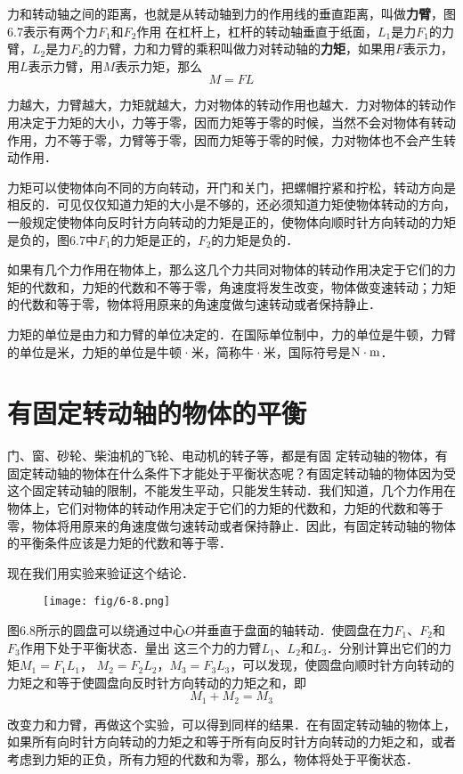 力和转动轴之间的距离，也就是从转动轴到力的作用线的垂直距离，叫做\textbf{力臂}，图6.7表示有两个力$F_1$和$F_2$作用
在杠杆上，杠杆的转动轴垂直于纸面，$L_1$是力$F_1$的力臂，$L_2$是力$F_2$的力臂，力和力臂的乘积叫做力对转动轴的\textbf{力矩}，如果用$F$表示力，用$L$表示力臂，用$M$表示力矩，那么
\[M=FL\]


力越大，力臂越大，力矩就越大，力对物体的转动作用也越大．力对物体的转动作用决定于力矩的大小，力等于零，因而力矩等于零的时候，当然不会对物体有转动作用，力不等于零，力臂等于零，因而力矩等于零的时候，力对物体也不会产生转动作用．

力矩可以使物体向不同的方向转动，开门和关门，把螺帽拧紧和拧松，转动方向是相反的．可见仅仅知道力矩的大小是不够的，还必须知道力矩使物体转动的方向，一般规定使物体向反时针方向转动的力矩是正的，使物体向顺时针方向转动的力矩是负的，图6.7中$F_1$的力矩是正的，$F_2$的力矩是负的．

如果有几个力作用在物体上，那么这几个力共同对物体的转动作用决定于它们的力矩的代数和，力矩的代数和不等于零，角速度将发生改变，物体做变速转动；力矩的代数和等于零，物体将用原来的角速度做匀速转动或者保持静止．

力矩的单位是由力和力臂的单位决定的．在国际单位制中，力的单位是牛顿，力臂的单位是米，力矩的单位是牛顿·米，简称牛·米，国际符号是${\rm N\cdot m}$．

\section{有固定转动轴的物体的平衡}
门、窗、砂轮、柴油机的飞轮、电动机的转子等，都是有固
定转动轴的物体，有固定转动轴的物体在什么条件下才能处于平衡状态呢？有固定转动轴的物体因为受这个固定转动轴的限制，不能发生平动，只能发生转动．我们知道，几个力作用在物体上，它们对物体的转动作用决定于它们的力矩的代数和，力矩的代数和等于零，物体将用原来的角速度做匀速转动或者保持静止．因此，有固定转动轴的物体的平衡条件应该是力矩的代数和等于零．

现在我们用实验来验证这个结论．
\begin{figure}[htp]
\centering\texttt{[image: fig/6-8.png]}
\caption{}
\end{figure}

图6.8所示的圆盘可以绕通过中心$O$并垂直于盘面的轴转动．使圆盘在力$F_1$、$F_2$和$F_3$作用下处于平衡状态．量出
这三个力的力臂$L_1$、$L_2$和$L_3$．分别计算出它们的力矩$M_1 =F_1 L_1$， $M_2 =F_2 L_2$，$M_3 =F_3 L_3$，可以发现，使圆盘向顺时针方向转动的力矩之和等于使圆盘向反时针方向转动的力矩之和，即
\[M_1+M_2=M_3\]

改变力和力臂，再做这个实验，可以得到同样的结果．在有固定转动轴的物体上，如果所有向时针方向转动的力矩之和等于所有向反时针方向转动的力矩之和，或者考虑到力矩的正负，所有力短的代数和为零，那么，物体将处于平衡状态．


